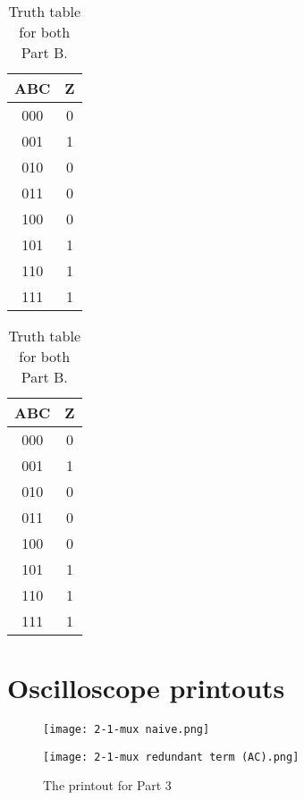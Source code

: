 \documentclass[11pt]{article}
\begin{document}
\begin{table}[h]
	\begin{minipage}[t]{0.45\textwidth}
		\centering
		
		\begin{tabular}{|c|c|}
            \hline
            ABC & Z \\ \hline
            000 & 0 \\ \hline
            001 & 1 \\ \hline
            010 & 0 \\ \hline
            011 & 0 \\ \hline
            100 & 0 \\ \hline
            101 & 1 \\ \hline
            110 & 1 \\ \hline
            111 & 1 \\ \hline
        \end{tabular}
        \caption{Truth table for Part A.}
        \label{truthA}
	\end{minipage}
	\begin{minipage}[t]{0.45\textwidth}
		\centering
		
		\begin{tabular}{|c|c|}
            \hline
            ABC & Z \\ \hline
            000 & 0 \\ \hline
            001 & 1 \\ \hline
            010 & 0 \\ \hline
            011 & 0 \\ \hline
            100 & 0 \\ \hline
            101 & 1 \\ \hline
            110 & 1 \\ \hline
            111 & 1 \\ \hline
        \end{tabular}
        \caption{Truth table for both Part B.}
        \label{truthB}
	\end{minipage}
	
\end{table}



\section{Oscilloscope printouts}
\begin{figure}[hp]
    \centering
    \texttt{[image: 2-1-mux naive.png]}
    \caption{The printout for Part 2}
    \label{printout2}
    \texttt{[image: 2-1-mux redundant term (AC).png]}
    \caption{The printout for Part 3}
    \label{printout3}
\end{figure}
\end{document}
